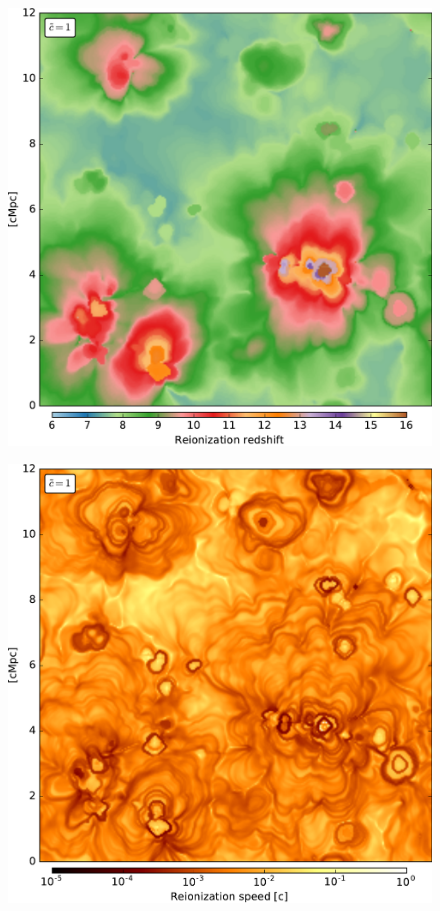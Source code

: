 \begin{figure}[htpb]
        \includegraphics[width=.95\linewidth]{img/04_mapreio/map_z_c1.pdf} 
        \caption{ }
 		\label{}
\end{figure}


\begin{figure}[htpb]
        \includegraphics[width=.95\linewidth]{img/04_mapreio/map_v_c1.pdf} 
        \caption{ }
 		\label{}
\end{figure}